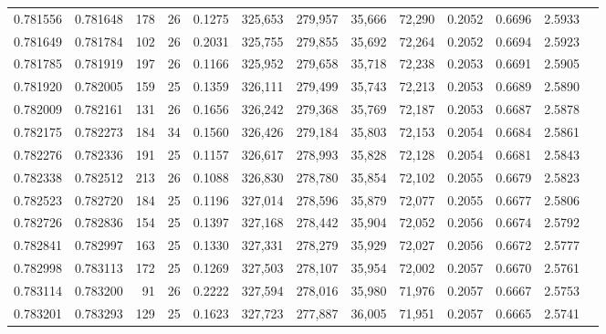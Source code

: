 \begin{tabular}{rrrrrrrrrrrrr}
0.781556 & 0.781648 &   178 &  26 &                                     0.1275 & 325,653 & 279,957 &  35,666 &  72,290 & 0.2052 & 0.6696 & 2.5933 \\
0.781649 & 0.781784 &   102 &  26 &                                     0.2031 & 325,755 & 279,855 &  35,692 &  72,264 & 0.2052 & 0.6694 & 2.5923 \\
0.781785 & 0.781919 &   197 &  26 &                                     0.1166 & 325,952 & 279,658 &  35,718 &  72,238 & 0.2053 & 0.6691 & 2.5905 \\
0.781920 & 0.782005 &   159 &  25 &                                     0.1359 & 326,111 & 279,499 &  35,743 &  72,213 & 0.2053 & 0.6689 & 2.5890 \\
0.782009 & 0.782161 &   131 &  26 &                                     0.1656 & 326,242 & 279,368 &  35,769 &  72,187 & 0.2053 & 0.6687 & 2.5878 \\
0.782175 & 0.782273 &   184 &  34 &                                     0.1560 & 326,426 & 279,184 &  35,803 &  72,153 & 0.2054 & 0.6684 & 2.5861 \\
0.782276 & 0.782336 &   191 &  25 &                                     0.1157 & 326,617 & 278,993 &  35,828 &  72,128 & 0.2054 & 0.6681 & 2.5843 \\
0.782338 & 0.782512 &   213 &  26 &                                     0.1088 & 326,830 & 278,780 &  35,854 &  72,102 & 0.2055 & 0.6679 & 2.5823 \\
0.782523 & 0.782720 &   184 &  25 &                                     0.1196 & 327,014 & 278,596 &  35,879 &  72,077 & 0.2055 & 0.6677 & 2.5806 \\
0.782726 & 0.782836 &   154 &  25 &                                     0.1397 & 327,168 & 278,442 &  35,904 &  72,052 & 0.2056 & 0.6674 & 2.5792 \\
0.782841 & 0.782997 &   163 &  25 &                                     0.1330 & 327,331 & 278,279 &  35,929 &  72,027 & 0.2056 & 0.6672 & 2.5777 \\
0.782998 & 0.783113 &   172 &  25 &                                     0.1269 & 327,503 & 278,107 &  35,954 &  72,002 & 0.2057 & 0.6670 & 2.5761 \\
0.783114 & 0.783200 &    91 &  26 &                                     0.2222 & 327,594 & 278,016 &  35,980 &  71,976 & 0.2057 & 0.6667 & 2.5753 \\
0.783201 & 0.783293 &   129 &  25 &                                     0.1623 & 327,723 & 277,887 &  36,005 &  71,951 & 0.2057 & 0.6665 & 2.5741 \\

\end{tabular}
